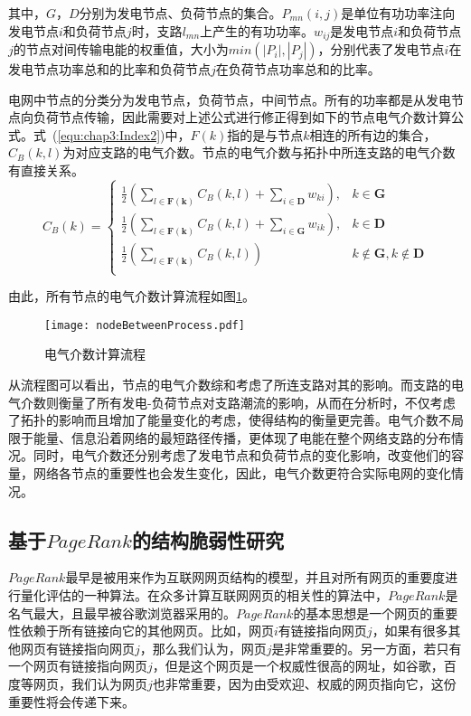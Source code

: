其中，$G$，$D$分别为发电节点、负荷节点的集合。$P_{mn}(i,j)$是单位有功功率注向发电节点$i$和负荷节点$j$时，支路$l_{mn}$上产生的有功功率。$w_{ij}$是发电节点$i$和负荷节点$j$的节点对间传输电能的权重值，大小为$min(|P_i|,|P_j|)$，分别代表了发电节点$i$在发电节点功率总和的比率和负荷节点$j$在负荷节点功率总和的比率。

电网中节点的分类分为发电节点，负荷节点，中间节点。所有的功率都是从发电节点向负荷节点传输，因此需要对上述公式进行修正得到如下的节点电气介数计算公式。式~(\ref{equ:chap3:Index2})中，$F(k)$指的是与节点$k$相连的所有边的集合，$C_B(k,l)$为对应支路的电气介数。节点的电气介数与拓扑中所连支路的电气介数有直接关系。
\begin{equation}\label{equ:chap3:Index2}
C_B(k)= \begin{cases}
        \displaystyle\frac{1}{2}\left(\sum\limits_{l\in\mathbf{F(k)}}{C_B(k,l)}+\sum\limits_{i\in\mathbf{D}}{w_{ki}}\right), &  k\in\mathbf{G} \\
        \displaystyle\frac{1}{2}\left(\sum\limits_{l\in\mathbf{F(k)}}{C_B(k,l)}+\sum\limits_{i\in\mathbf{G}}{w_{ik}}\right), &  k\in\mathbf{D} \\
        \displaystyle\frac{1}{2}\left(\sum\limits_{l\in\mathbf{F(k)}}{C_B(k,l)}\right) & k\not\in\mathbf{G},k\not\in\mathbf{D} \\
      \end{cases}
\end{equation}

由此，所有节点的电气介数计算流程如图\ref{fig:nodeBetweenPro}。
\begin{figure}[H] %
  \centering
  \texttt{[image: nodeBetweenProcess.pdf]}
  \caption{电气介数计算流程}
  \label{fig:nodeBetweenPro}
\end{figure}

从流程图可以看出，节点的电气介数综和考虑了所连支路对其的影响。而支路的电气介数则衡量了所有发电-负荷节点对支路潮流的影响，从而在分析时，不仅考虑了拓扑的影响而且增加了能量变化的考虑，使得结构的衡量更完善。电气介数不局限于能量、信息沿着网络的最短路径传播，更体现了电能在整个网络支路的分布情况。同时，电气介数还分别考虑了发电节点和负荷节点的变化影响，改变他们的容量，网络各节点的重要性也会发生变化，因此，电气介数更符合实际电网的变化情况。

\subsection{基于$PageRank$的结构脆弱性研究}
\label{sec:pagerank}
$PageRank$最早是被用来作为互联网网页结构的模型，并且对所有网页的重要度进行量化评估的一种算法\cite{PR1,PR2,PR3}。在众多计算互联网网页的相关性的算法中，$PageRank$是名气最大，且最早被谷歌浏览器采用的。$PageRank$的基本思想是一个网页的重要性依赖于所有链接向它的其他网页。比如，网页$i$有链接指向网页$j$，如果有很多其他网页有链接指向网页$j$，那么我们认为，网页$j$是非常重要的。另一方面，若只有一个网页有链接指向网页$j$，但是这个网页是一个权威性很高的网址，如谷歌，百度等网页，我们认为网页$j$也非常重要，因为由受欢迎、权威的网页指向它，这份重要性将会传递下来。


